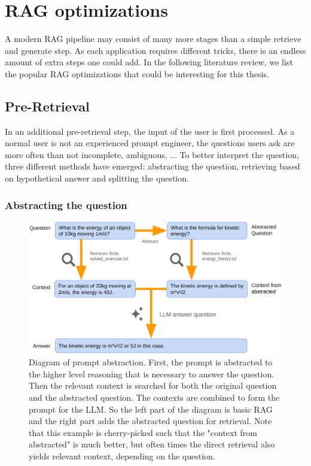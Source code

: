 \section{RAG optimizations}
A modern RAG pipeline may consist of many more stages than a simple retrieve and generate step. As each application requires different tricks, there is an endless amount of extra steps one could add. In the following literature review, we list the popular RAG optimizations that could be interesting for this thesis.

\subsection{Pre-Retrieval}
\label{sec:pre_retrieval}
In an additional pre-retrieval step, the input of the user is first processed. As a normal user is not an experienced prompt engineer, the questions users ask are more often than not incomplete, ambiguous, ... To better interpret the question, three different methods have emerged: abstracting the question, retrieving based on hypothetical answer and splitting the question.

\subsubsection{Abstracting the question}

\begin{figure}[h]
	\centering
	\includegraphics[width=0.9\linewidth]{fig/rag_abstract_prompt.png}
	\caption{Diagram of prompt abstraction. First, the prompt is abstracted to the higher level reasoning that is necessary to answer the question. Then the relevant context is searched for both the original question and the abstracted question. The contexts are combined to form the prompt for the LLM. So the left part of the diagram is basic RAG and the right part adds the abstracted question for retrieval. Note that this example is cherry-picked such that the "context from abstracted" is much better, but often times the direct retrieval also yields relevant context, depending on the question.}
	\label{fig:rag_abstract_prompt}
\end{figure}

